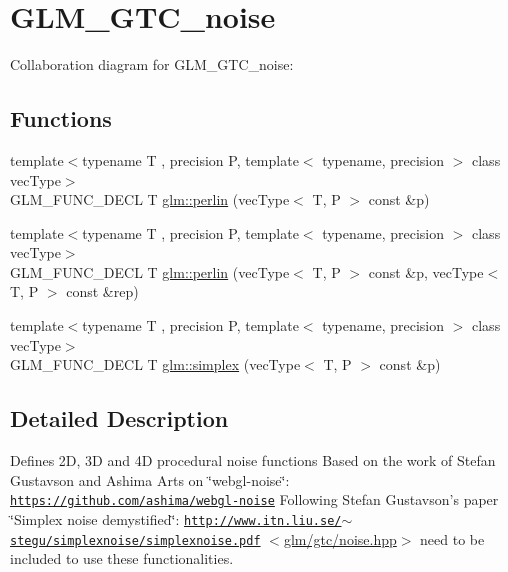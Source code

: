 \hypertarget{group__gtc__noise}{\section{G\-L\-M\-\_\-\-G\-T\-C\-\_\-noise}
\label{group__gtc__noise}
}
Collaboration diagram for G\-L\-M\-\_\-\-G\-T\-C\-\_\-noise\-:
\subsection*{Functions}
\begin{DoxyCompactItemize}
\item 
{\footnotesize template$<$typename T , precision P, template$<$ typename, precision $>$ class vec\-Type$>$ }\\G\-L\-M\-\_\-\-F\-U\-N\-C\-\_\-\-D\-E\-C\-L T \hyperlink{group__gtc__noise_ga14e5975486b2b36e747861d3c65b16c1}{glm\-::perlin} (vec\-Type$<$ T, P $>$ const \&p)
\item 
{\footnotesize template$<$typename T , precision P, template$<$ typename, precision $>$ class vec\-Type$>$ }\\G\-L\-M\-\_\-\-F\-U\-N\-C\-\_\-\-D\-E\-C\-L T \hyperlink{group__gtc__noise_ga7e103ffffacb322fe2d4863c372ae2fd}{glm\-::perlin} (vec\-Type$<$ T, P $>$ const \&p, vec\-Type$<$ T, P $>$ const \&rep)
\item 
{\footnotesize template$<$typename T , precision P, template$<$ typename, precision $>$ class vec\-Type$>$ }\\G\-L\-M\-\_\-\-F\-U\-N\-C\-\_\-\-D\-E\-C\-L T \hyperlink{group__gtc__noise_ga05f5ab240c9a3fdeee353636e464c285}{glm\-::simplex} (vec\-Type$<$ T, P $>$ const \&p)
\end{DoxyCompactItemize}


\subsection{Detailed Description}
Defines 2\-D, 3\-D and 4\-D procedural noise functions Based on the work of Stefan Gustavson and Ashima Arts on \char`\"{}webgl-\/noise\char`\"{}\-: \href{https://github.com/ashima/webgl-noise}{\tt https\-://github.\-com/ashima/webgl-\/noise} Following Stefan Gustavson's paper \char`\"{}\-Simplex noise demystified\char`\"{}\-: \href{http://www.itn.liu.se/~stegu/simplexnoise/simplexnoise.pdf}{\tt http\-://www.\-itn.\-liu.\-se/$\sim$stegu/simplexnoise/simplexnoise.\-pdf} $<$\hyperlink{noise_8hpp}{glm/gtc/noise.\-hpp}$>$ need to be included to use these functionalities. 


